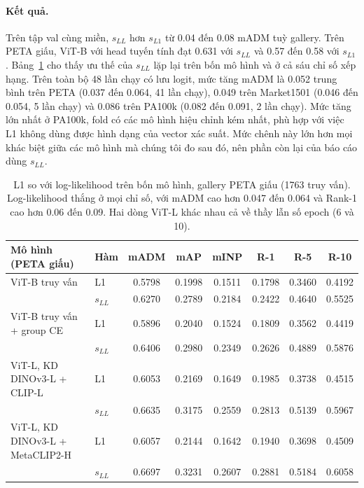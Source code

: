\documentclass[11pt,a4paper]{article}
\begin{document}
\paragraph{Kết quả.} Trên tập val cùng miền, $s_{LL}$ hơn $s_{L1}$ từ 0.04 đến 0.08 mADM tuỳ gallery. Trên PETA giấu, ViT-B với head tuyến tính đạt 0.631 với $s_{LL}$ và 0.57 đến 0.58 với $s_{L1}$. Bảng~\ref{tab:llvsl1} cho thấy ưu thế của $s_{LL}$ lặp lại trên bốn mô hình và ở cả sáu chỉ số xếp hạng. Trên toàn bộ 48 lần chạy có lưu logit, mức tăng mADM là 0.052 trung bình trên PETA (0.037 đến 0.064, 41 lần chạy), 0.049 trên Market1501 (0.046 đến 0.054, 5 lần chạy) và 0.086 trên PA100k (0.082 đến 0.091, 2 lần chạy). Mức tăng lớn nhất ở PA100k, fold có các mô hình hiệu chỉnh kém nhất, phù hợp với việc L1 không dùng được hình dạng của vector xác suất. Mức chênh này lớn hơn mọi khác biệt giữa các mô hình mà chúng tôi đo sau đó, nên phần còn lại của báo cáo dùng $s_{LL}$.

\begin{table}[H]
\centering\small
\begin{tabular}{@{}llcccccc@{}}
\toprule
Mô hình (PETA giấu) & Hàm & mADM & mAP & mINP & R-1 & R-5 & R-10 \\
\midrule
ViT-B truy vấn & L1 & 0.5798 & 0.1998 & 0.1511 & 0.1798 & 0.3460 & 0.4192 \\
 & $s_{LL}$ & 0.6270 & 0.2789 & 0.2184 & 0.2422 & 0.4640 & 0.5525 \\
ViT-B truy vấn + group CE & L1 & 0.5896 & 0.2040 & 0.1524 & 0.1809 & 0.3562 & 0.4419 \\
 & $s_{LL}$ & 0.6406 & 0.2980 & 0.2349 & 0.2626 & 0.4889 & 0.5876 \\
ViT-L, KD DINOv3-L + CLIP-L & L1 & 0.6053 & 0.2169 & 0.1649 & 0.1985 & 0.3738 & 0.4515 \\
 & $s_{LL}$ & 0.6635 & 0.3175 & 0.2559 & 0.2813 & 0.5139 & 0.5967 \\
ViT-L, KD DINOv3-L + MetaCLIP2-H & L1 & 0.6057 & 0.2144 & 0.1642 & 0.1940 & 0.3698 & 0.4509 \\
 & $s_{LL}$ & 0.6697 & 0.3231 & 0.2607 & 0.2881 & 0.5184 & 0.6058 \\
\bottomrule
\end{tabular}
\caption{L1 so với log-likelihood trên bốn mô hình, gallery PETA giấu (1763 truy vấn). Log-likelihood thắng ở mọi chỉ số, với mADM cao hơn 0.047 đến 0.064 và Rank-1 cao hơn 0.06 đến 0.09. Hai dòng ViT-L khác nhau cả về thầy lẫn số epoch (6 và 10).}
\label{tab:llvsl1}
\end{table}
\end{document}
